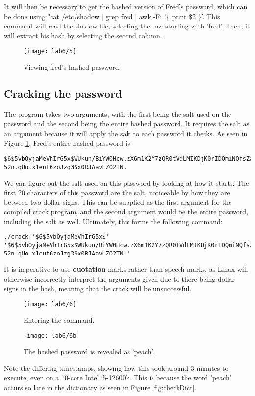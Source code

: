 It will then be necessary to get the hashed version of Fred's password, which can be done using
"cat /etc/shadow | grep fred | awk -F: '\{ print \$2 \}'.
This command will read the shadow file, selecting the row starting with 'fred'.
Then, it will extract his hash by selecting the second column.

\begin{figure}[H]
    \centering
    \texttt{[image: lab6/5]}
    \caption{Viewing fred's hashed password.}
    \label{fig:viewFredHash}
\end{figure}

\subsection{Cracking the password}\label{subsec:cracking-the-password}
The program takes two arguments, with the first being the salt used on the password and the
second being the entire hashed password.
It requires the salt as an argument because it will apply the salt to each password it checks.
As seen in Figure \ref{fig:viewFredHash}, Fred's entire hashed password is

\begin{verbatim}
$6$5vbOyjaMeVhIrG5x$WUkun/BiYW0Hcw.zX6m1K2Y7zQR0tVdLMIKDjK0rIDQmiNQfsZa
52n.qUo.x1eut6zoJzg3Sx0RJAavLZO2TN.
\end{verbatim}

We can figure out the salt used on this password by looking at how it starts.
The first 20 characters of this password are the salt, noticeable by how they are between two dollar signs.
This can be supplied as the first argument for the compiled crack program, and the second argument would be the
entire password, including the salt as well.
Ultimately, this forms the following command:

\begin{verbatim}
./crack '$6$5vbOyjaMeVhIrG5x$'
'$6$5vbOyjaMeVhIrG5x$WUkun/BiYW0Hcw.zX6m1K2Y7zQR0tVdLMIKDjK0rIDQmiNQfsZa
52n.qUo.x1eut6zoJzg3Sx0RJAavLZO2TN.'
\end{verbatim}

It is imperative to use \textbf{quotation} marks rather than speech marks, as Linux will otherwise incorrectly
interpret the arguments given due to there being dollar signs in the hash, meaning that the crack will be
unsuccessful.

\begin{figure}[H]
    \centering
    \texttt{[image: lab6/6]}
    \caption{Entering the command.}
    \label{fig:cracking}
\end{figure}

\begin{figure}[H]
    \centering
    \texttt{[image: lab6/6b]}
    \caption{The hashed password is revealed as 'peach'.}
    \label{fig:cracked}
\end{figure}

Note the differing timestamps, showing how this took around 3 minutes to execute, even on a 10-core
Intel i5-12600k.
This is because the word 'peach' occurs so late in the dictionary as seen in Figure \ref{fig:checkDict}.


